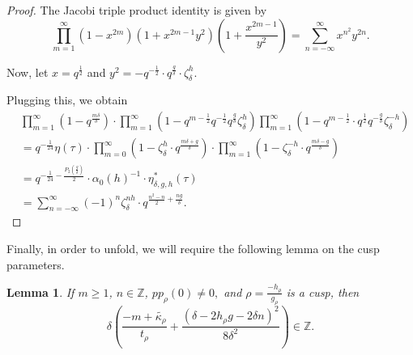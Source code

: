 \documentclass[10pt]{amsart}
\newtheorem{lemma}[theorem]{Lemma}
\theoremstyle{definition}
\theoremstyle{remark}
\numberwithin{equation}{section}
\begin{document}
	\begin{proof}
		The Jacobi triple product identity is given by
		$$
		\prod\limits_{m=1}^{\infty} (1-x^{2m})(1+x^{2m-1}y^2)(1+\frac{x^{2m-1}}{y^2}) = \sum\limits_{n=-\infty}^\infty x^{n^2}y^{2n}.
		$$
		
		Now, let $x=q^{\frac{1}{2}}$ and $y^2 = -q^{-\frac{1}{2}}\cdot q^{\frac{g}{\delta}}\cdot\zeta_{\delta}^h.$
		
		Plugging this, we obtain
		\begin{align*}
			&\prod\limits_{m=1}^\infty (1-q^\frac{m\delta}{\delta}) \cdot\prod\limits_{m=1}^\infty (1-q^{m-\frac{1}{2}}q^{-\frac{1}{2}}q^{\frac{g}{\delta}}\zeta_\delta^h)\prod\limits_{m=1}^\infty (1-q^{m-\frac{1}{2}}\cdot q^{\frac{1}{2}} q^{-\frac{g}{\delta}}\zeta_{\delta}^{-h}) \\
			&=q^{-\frac{1}{24}}\eta(\tau)\cdot\prod\limits_{m=0}^\infty (1-\zeta_\delta^h\cdot q^{\frac{m\delta+ g}{\delta}})\cdot\prod\limits_{m=1}^\infty (1 - \zeta_{\delta}^{-h}\cdot q^{\frac{m\delta -g}{\delta}}) \\
			&= q^{-\frac{1}{24} - \frac{P_2(\frac{g}{\delta})}{2}}\cdot\alpha_0(h)^{-1}\cdot\eta_{\delta,g,h}^\ast(\tau) \\
			&=\sum\limits_{n=-\infty}^\infty (-1)^n \zeta_{\delta}^{nh}\cdot q^{\frac{n^2-n}{2}+\frac{ng}{\delta}}.
		\end{align*}
		
	\end{proof}
	
		Finally, in order to unfold, we will require the following lemma on the cusp parameters.
	
	
	
	\begin{lemma}\label{lem:cuspParamLemma}
		If $m\ge 1$, $n\in \mathbb Z$, $pp_\rho(0)\neq 0,$  and $\rho=\frac{-h_\rho}{g_\rho}$ is a cusp, then
		\[
		\delta\left(\frac{-m+\widetilde{\kappa_\rho}}{t_\rho}+
		\frac{(\delta-2h_\rho g-2\delta n)^2}{8\delta^2}\right)\in \mathbb Z.
		\]
	\end{lemma}
	
\end{document}
